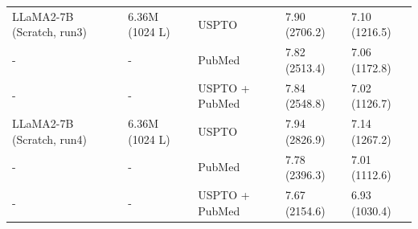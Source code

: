 \begin{table}[h]
\begin{tabularx}{1\textwidth}{lXXXX}
LLaMA2-7B (Scratch, run3) & 6.36M (1024 L) & USPTO  & 7.90 (2706.2) & 7.10 (1216.5) \\ %
- & - & PubMed & 7.82 (2513.4) & 7.06 (1172.8) \\ %
- & - & USPTO + PubMed & 7.84 (2548.8) & 7.02 (1126.7) \\ %
\hline

LLaMA2-7B (Scratch, run4) & 6.36M (1024 L) & USPTO  & 7.94 (2826.9) & 7.14 (1267.2) \\ %
- & - & PubMed & 7.78 (2396.3) & 7.01 (1112.6) \\ %
- & - & USPTO + PubMed & 7.67 (2154.6) & 6.93 (1030.4) \\ %
\hline



\bottomrule
\end{tabularx}
\label{tab:div_vs_ce_val}

\end{table}






